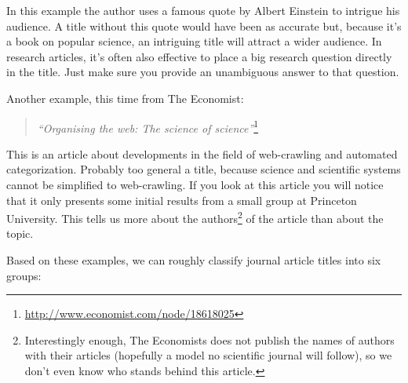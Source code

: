 \documentclass[graybox,envcountchap,sectrefs,UStrade]{svmono}
\begin{document}
In this example the author uses a famous quote by Albert Einstein to intrigue his audience. A title without this quote would have been as accurate but, because it's a book on popular science, an intriguing title will attract a wider audience. In research articles, it's often also effective to place a big research question directly in the title. Just make sure you provide an unambiguous answer to that question.\par

Another example, this time from The Economist:

\begin{quote}
    \emph{``Organising the web: The science of science''}\footnote{\url{http://www.economist.com/node/18618025}}
\end{quote}

This is an article about developments in the field of web-crawling and automated categorization. Probably too general a title, because science and scientific systems cannot be simplified to web-crawling. If you look at this article you will notice that it only presents some initial results from a small group at Princeton University. This tells us more about the authors\footnote{Interestingly enough, The Economists does not publish the names of authors with their articles (hopefully a model no scientific journal will follow), so we don't even know who stands behind this article.} of the article than about the topic. \par

Based on these examples, we can roughly classify journal article titles into six groups:
\end{document}

